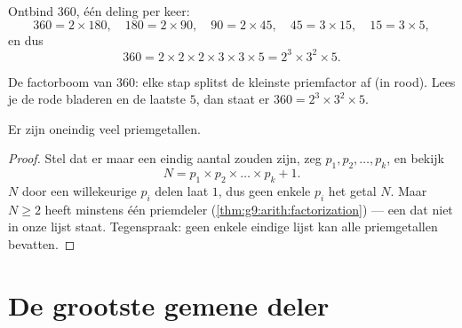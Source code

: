 \begin{example}\label{ex:g9:arith:factorization}
Ontbind $360$, één deling per keer:
\[
360 = 2 \times 180, \quad
180 = 2 \times 90, \quad
90 = 2 \times 45, \quad
45 = 3 \times 15, \quad
15 = 3 \times 5,
\]
en dus
\[
360 = 2 \times 2 \times 2 \times 3 \times 3 \times 5 = 2^3 \times 3^2
\times 5 .
\]
\end{example}

\begin{omfigure}

{\small De factorboom van $360$: elke stap splitst de kleinste priemfactor af (in
rood). Lees je de rode bladeren en de laatste $5$, dan staat er
$360 = 2^3 \times 3^2 \times 5$.}
\end{omfigure}

\begin{theorem}[Euclides]\label{thm:g9:arith:euclid}
Er zijn oneindig veel priemgetallen.
\end{theorem}

\begin{proof}
Stel dat er maar een eindig aantal zouden zijn, zeg $p_1, p_2, \dots, p_k$, en
bekijk
\[
N = p_1 \times p_2 \times \dots \times p_k + 1 .
\]
$N$ door een willekeurige $p_i$ delen laat  $1$, dus  geen enkele $p_i$
het getal $N$. Maar $N \geq 2$ heeft minstens één priemdeler
(\cref{thm:g9:arith:factorization}) --- een  dat niet in onze lijst
staat. Tegenspraak: geen enkele eindige lijst kan alle priemgetallen bevatten.
\end{proof}

\section{De grootste gemene deler}


